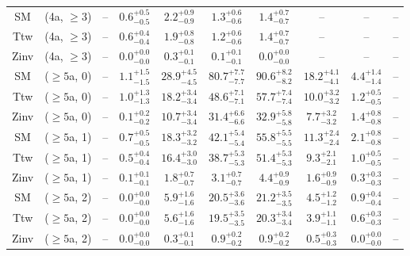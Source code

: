 \begin{table}[h!]
{\begin{tabular}{cccccccccc}
	SM & (4a, $\ge3$) & -- & $0.6^{+ 0.5 }_{- 0.5 }$ & $2.2^{+ 0.9 }_{- 0.9 }$ & $1.3^{+ 0.6 }_{- 0.6 }$ & $1.4^{+ 0.7 }_{- 0.7 }$ & -- & -- & -- \\[0.5ex] 
	Ttw & (4a, $\ge3$) & -- & $0.6^{+ 0.4 }_{- 0.4 }$ & $1.9^{+ 0.8 }_{- 0.8 }$ & $1.2^{+ 0.6 }_{- 0.6 }$ & $1.4^{+ 0.7 }_{- 0.7 }$ & -- & -- & -- \\[0.5ex] 
	Zinv & (4a, $\ge3$) & -- & $0.0^{+ 0.0 }_{- 0.0 }$ & $0.3^{+ 0.1 }_{- 0.1 }$ & $0.1^{+ 0.1 }_{- 0.1 }$ & $0.0^{+ 0.0 }_{- 0.0 }$ & -- & -- & -- \\[0.5ex] 
	SM & ($\ge5$a, 0) & -- & $1.1^{+ 1.5 }_{- 1.5 }$ & $28.9^{+ 4.5 }_{- 4.5 }$ & $80.7^{+ 7.7 }_{- 7.7 }$ & $90.6^{+ 8.2 }_{- 8.2 }$ & $18.2^{+ 4.1 }_{- 4.1 }$ & $4.4^{+ 1.4 }_{- 1.4 }$ & -- \\[0.5ex] 
	Ttw & ($\ge5$a, 0) & -- & $1.0^{+ 1.3 }_{- 1.3 }$ & $18.2^{+ 3.4 }_{- 3.4 }$ & $48.6^{+ 7.1 }_{- 7.1 }$ & $57.7^{+ 7.4 }_{- 7.4 }$ & $10.0^{+ 3.2 }_{- 3.2 }$ & $1.2^{+ 0.5 }_{- 0.5 }$ & -- \\[0.5ex] 
	Zinv & ($\ge5$a, 0) & -- & $0.1^{+ 0.2 }_{- 0.2 }$ & $10.7^{+ 3.4 }_{- 3.4 }$ & $31.4^{+ 6.6 }_{- 6.6 }$ & $32.9^{+ 5.8 }_{- 5.8 }$ & $7.7^{+ 3.2 }_{- 3.2 }$ & $1.4^{+ 0.8 }_{- 0.8 }$ & -- \\[0.5ex] 
	SM & ($\ge5$a, 1) & -- & $0.7^{+ 0.5 }_{- 0.5 }$ & $18.3^{+ 3.2 }_{- 3.2 }$ & $42.1^{+ 5.4 }_{- 5.4 }$ & $55.8^{+ 5.5 }_{- 5.5 }$ & $11.3^{+ 2.4 }_{- 2.4 }$ & $2.1^{+ 0.8 }_{- 0.8 }$ & -- \\[0.5ex] 
	Ttw & ($\ge5$a, 1) & -- & $0.5^{+ 0.4 }_{- 0.4 }$ & $16.4^{+ 3.0 }_{- 3.0 }$ & $38.7^{+ 5.3 }_{- 5.3 }$ & $51.4^{+ 5.3 }_{- 5.3 }$ & $9.3^{+ 2.1 }_{- 2.1 }$ & $1.0^{+ 0.5 }_{- 0.5 }$ & -- \\[0.5ex] 
	Zinv & ($\ge5$a, 1) & -- & $0.1^{+ 0.1 }_{- 0.1 }$ & $1.8^{+ 0.7 }_{- 0.7 }$ & $3.1^{+ 0.7 }_{- 0.7 }$ & $4.4^{+ 0.9 }_{- 0.9 }$ & $1.6^{+ 0.9 }_{- 0.9 }$ & $0.3^{+ 0.3 }_{- 0.3 }$ & -- \\[0.5ex] 
	SM & ($\ge5$a, 2) & -- & $0.0^{+ 0.0 }_{- 0.0 }$ & $5.9^{+ 1.6 }_{- 1.6 }$ & $20.5^{+ 3.6 }_{- 3.6 }$ & $21.2^{+ 3.5 }_{- 3.5 }$ & $4.5^{+ 1.2 }_{- 1.2 }$ & $0.9^{+ 0.4 }_{- 0.4 }$ & -- \\[0.5ex] 
	Ttw & ($\ge5$a, 2) & -- & $0.0^{+ 0.0 }_{- 0.0 }$ & $5.6^{+ 1.6 }_{- 1.6 }$ & $19.5^{+ 3.5 }_{- 3.5 }$ & $20.3^{+ 3.4 }_{- 3.4 }$ & $3.9^{+ 1.1 }_{- 1.1 }$ & $0.6^{+ 0.3 }_{- 0.3 }$ & -- \\[0.5ex] 
	Zinv & ($\ge5$a, 2) & -- & $0.0^{+ 0.0 }_{- 0.0 }$ & $0.3^{+ 0.1 }_{- 0.1 }$ & $0.9^{+ 0.2 }_{- 0.2 }$ & $0.9^{+ 0.2 }_{- 0.2 }$ & $0.5^{+ 0.3 }_{- 0.3 }$ & $0.0^{+ 0.0 }_{- 0.0 }$ & -- \\[0.5ex] 

\end{tabular}}
\end{table}
